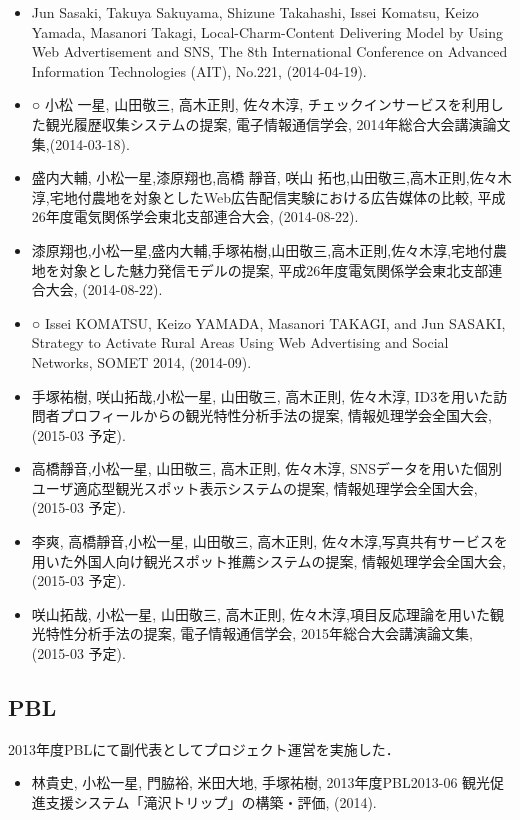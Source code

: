 \documentclass{jsarticle}
\begin{document}
\begin{itemize}
\item Jun Sasaki, Takuya Sakuyama, Shizune Takahashi, Issei Komatsu, Keizo Yamada, Masanori Takagi, Local-Charm-Content Delivering Model by Using Web Advertisement and SNS, The 8th International Conference on Advanced Information Technologies (AIT), No.221, (2014-04-19).
\item ○ 小松 一星, 山田敬三, 高木正則, 佐々木淳, チェックインサービスを利用した観光履歴収集システムの提案, 電子情報通信学会, 2014年総合大会講演論文集,(2014-03-18).
\item 盛内大輔, 小松一星,漆原翔也,高橋 靜音, 咲山 拓也,山田敬三,高木正則,佐々木淳,宅地付農地を対象としたWeb広告配信実験における広告媒体の比較, 平成26年度電気関係学会東北支部連合大会, (2014-08-22).
\item 漆原翔也,小松一星,盛内大輔,手塚祐樹,山田敬三,高木正則,佐々木淳,宅地付農地を対象とした魅力発信モデルの提案, 平成26年度電気関係学会東北支部連合大会, (2014-08-22).
\item ○ Issei KOMATSU, Keizo YAMADA, Masanori TAKAGI,  and Jun SASAKI, Strategy to Activate Rural Areas Using Web Advertising and Social Networks, SOMET 2014, (2014-09).
\item 手塚祐樹, 咲山拓哉,小松一星, 山田敬三, 高木正則, 佐々木淳, ID3を用いた訪問者プロフィールからの観光特性分析手法の提案, 情報処理学会全国大会, (2015-03 予定).
\item 高橋靜音,小松一星, 山田敬三, 高木正則, 佐々木淳, SNSデータを用いた個別ユーザ適応型観光スポット表示システムの提案, 情報処理学会全国大会, (2015-03 予定).
\item 李爽, 高橋靜音,小松一星, 山田敬三, 高木正則, 佐々木淳,写真共有サービスを用いた外国人向け観光スポット推薦システムの提案, 情報処理学会全国大会, (2015-03 予定).
\item 咲山拓哉, 小松一星, 山田敬三, 高木正則, 佐々木淳,項目反応理論を用いた観光特性分析手法の提案, 電子情報通信学会, 2015年総合大会講演論文集, (2015-03 予定).
\end{itemize}

\subsection*{PBL}

2013年度PBLにて副代表としてプロジェクト運営を実施した．

\begin{itemize}
\item 林貴史, 小松一星, 門脇裕, 米田大地, 手塚祐樹, 2013年度PBL2013-06 観光促進支援システム「滝沢トリップ」の構築・評価, (2014).
\end{itemize}
\end{document}
